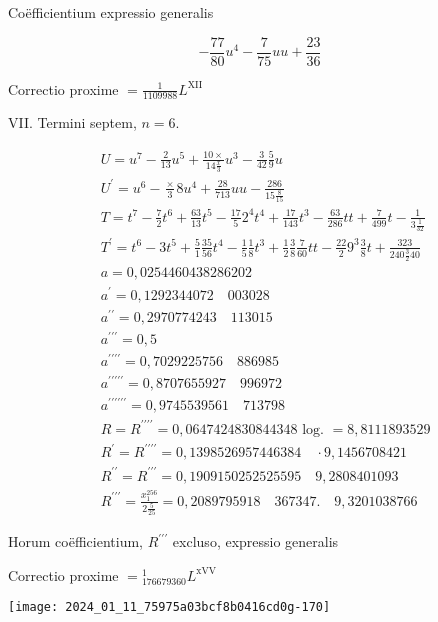 \documentclass[10pt]{article}
\begin{document}
Coëfficientium expressio generalis

\[
-\frac{77}{80} u^{4}-\frac{7}{75} u u+\frac{23}{36}
\]

Correctio proxime \(=\frac{1}{1109988} L^{\mathrm{XII}}\)

VII. Termini septem, \(n=6\).

\[
\begin{aligned}
& U=u^{7}-\frac{2}{13} u^{5}+\frac{10 \times}{14 \frac{x}{3}} u^{3}-\frac{3}{42} \frac{5}{9} u \\
& U^{\prime}=u^{6}-\frac{\times}{3} 8 u^{4}+\frac{28}{713} u u-\frac{286}{15 \frac{8}{15}} \\
& T=t^{7}-\frac{7}{2} t^{6}+\frac{63}{13} t^{5}-\frac{17}{5} 2^{4} t^{4}+\frac{17}{143} t^{3}-\frac{63}{286} t t+\frac{7}{499} t-\frac{1}{3 \frac{1}{32}} \\
& T^{\prime}=t^{6}-3 t^{5}+\frac{5}{1} \frac{35}{56} t^{4}-\frac{1}{5} \frac{1}{8} t^{3}+\frac{1}{2} \frac{3}{8} \frac{7}{60} t t-\frac{22}{2} 9^{3} \frac{3}{8} t+\frac{323}{240 \frac{3}{2} 40} \\
& a=0,0254460438286202 \\
& a^{\prime}=0,1292344072 \quad 003028 \\
& a^{\prime \prime}=0,2970774243 \quad 113015 \\
& a^{\prime \prime \prime}=0,5 \\
& a^{\prime \prime \prime \prime}=0,7029225756 \quad 886985 \\
& a^{\prime \prime \prime \prime \prime}=0,8707655927 \quad 996972 \\
& a^{\prime \prime \prime \prime \prime \prime}=0,9745539561 \quad 713798 \\
& R=R^{\prime \prime \prime \prime}=0,0647424830844348 \text { log. }=8,8111893529 \\
& R^{\prime}=R^{\prime \prime \prime \prime}=0,1398526957446384 \quad \cdot 9,1456708421 \\
& R^{\prime \prime}=R^{\prime \prime \prime}=0,1909150252525595 \quad 9,2808401093 \\
& R^{\prime \prime \prime}=\frac{x_{1}^{256}}{2 \frac{5}{25}}=0,2089795918 \quad 367347 . \quad 9,3201038766
\end{aligned}
\]

Horum coëfficientium, \(R^{\prime \prime \prime}\) excluso, expressio generalis

Correctio proxime \(={ }_{176679360}^{1} L^{\mathrm{xVV}}\)

\begin{center}
\texttt{[image: 2024\_01\_11\_75975a03bcf8b0416cd0g-170]}
\end{center}
\end{document}
